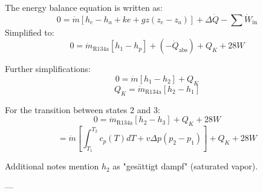 The energy balance equation is written as:  
\[
0 = \dot{m} \left[ h_e - h_a + ke + gz(z_e - z_a) \right] + \Delta \dot{Q} - \sum \dot{W}_{\text{in}}
\]  
Simplified to:  
\[
0 = \dot{m}_{\text{R134a}} \left[ h_1 - h_p \right] + (-\dot{Q}_{\text{abs}}) + Q_K + 28W
\]  

Further simplifications:  
\[
0 = \dot{m} \left[ h_1 - h_2 \right] + Q_K
\]  
\[
Q_K = \dot{m}_{\text{R134a}} \left[ h_2 - h_1 \right]
\]  

For the transition between states 2 and 3:  
\[
0 = \dot{m}_{\text{R134a}} \left[ h_2 - h_3 \right] + Q_K + 28W
\]  
\[
= \dot{m} \left[ \int_{T_1}^{T_2} c_p(T) dT + v \Delta p (p_2 - p_1) \right] + Q_K + 28W
\]  

Additional notes mention \( h_2 \) as "gesättigt dampf" (saturated vapor).  

---